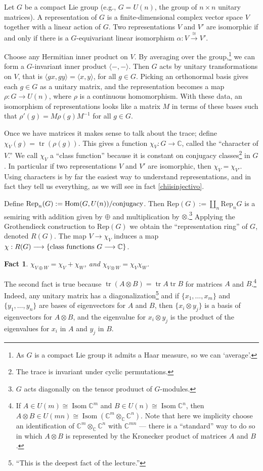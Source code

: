 \documentclass{article}
\newcommand{\C}{\mathbb{C}}
\DeclareMathOperator{\tr}{tr}
\DeclareMathOperator{\Hom}{Hom}
\renewcommand{\to}{\longrightarrow}
\newtheorem{fact}[thm]{Fact}
\theoremstyle{definition}
\begin{document}
Let $G$ be a compact Lie group (e.g., $G=U(n)$, the group of $n\times n$ unitary matrices).  A representation of $G$ is a finite-dimensional complex vector space $V$ together with a linear action of $G$.  Two representations $V$ and $V'$ are isomorphic if and only if there is a $G$-equivariant linear isomorphism $\alpha: V \stackrel{\cong}{\to} V'$.

Choose any Hermitian inner product on $V$.  By averaging over the group,\footnote{As $G$ is a compact Lie group it admits a Haar measure, so we can `average'.} we can form a $G$-invariant inner product $\langle - , - \rangle$. Then $G$ acts by unitary transformations on $V$, that is $\langle gx, gy \rangle = \langle x, y \rangle$, for all $g\in G$.  Picking an orthonormal basis gives each $g\in G$ as a unitary matrix, and the representation becomes a map $\rho: G \to U(n)$, where $\rho$ is a continuous homomorphism.  With these data, an isomorphism of representations looks like a matrix $M$ in terms of these bases such that $\rho'(g) = M \rho(g) M^{-1}$ for all $g \in G$.

Once we have matrices it makes sense to talk about the trace; define $\chi_V(g) = \tr(\rho(g))$.  This gives a function $\chi_V: G \to \C$, called the ``character of $V$.''  We call $\chi_V$ a ``class function'' because it is constant on conjugacy classes\footnote{The trace is invariant under cyclic permutations.} in $G$.  In particular if two representations $V$ and $V'$ are isomorphic, then $\chi_V = \chi_{V'}$.
Using characters is by far the easiest way to understand representations, and in fact they tell us everything, as we will see in fact \ref{chiisinjectivo}.

Define $\mathrm{Rep}_n(G) := \Hom(G, U(n)) /\textup{conjugacy}$.  Then $\mathrm{Rep}(G) := \coprod_n \mathrm{Rep}_n G$ is a semiring with addition given by $\oplus$ and multiplication by $\otimes$.\footnote{$G$ acts diagonally on the tensor produuct of $G$-modules.} Applying the Grothendieck construction to $\mathrm{Rep}(G)$ we obtain the ``representation ring'' of $G$, denoted $R(G)$.  The map $V \to \chi_V$ induces a map $\chi: R(G) \to \{\hbox{class functions $G \to \C$}\}$.

\begin{fact}
$\chi_{V \oplus W} = \chi_V + \chi_W$, and $\chi_{V \otimes W} = \chi_V \chi_W$.
\end{fact}
The second fact is true because $\tr(A \otimes B) = \tr A \tr B$ for matrices $A$ and $B$.\footnote{If $A \in U(m) \cong \operatorname{Isom} \C^m$ and $B \in U(n) \cong \operatorname{Isom} \C^n$, then $A \otimes B \in U(mn) \cong \operatorname{Isom} (\C^m \otimes_\C \C^n)$. Note that here we implicity choose an identification of $\C^m\otimes_\C\C^n$ with $\C^{mn}$ --- there is a ``standard'' way to do so in which $A\otimes B$ is represented by the Kronecker product of matrices $A$ and $B$.}  Indeed, any unitary matrix has a diagonalization\footnote{``This is the deepest fact of the lecture.''} and if $\{x_1, \ldots, x_m\}$ and $\{y_1, \ldots, y_n\}$ are bases of eigenvectors for $A$ and $B$, then $\{x_i \otimes y_j\}$ is a basis of eigenvectors for $A \otimes B$, and the eigenvalue for $x_i \otimes y_j$ is the product of the eigenvalues for $x_i$ in $A$ and $y_j$ in $B$.
\end{document}
